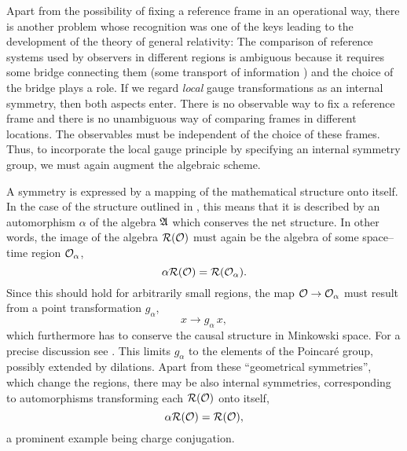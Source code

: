 Apart from the possibility of fixing a reference frame in an 
operational way, there is another problem whose recognition
was one of the 
keys leading to the development of the theory of general relativity:
The comparison of reference systems used by observers in different
regions is ambiguous because it requires some bridge connecting them 
(some transport of information \cite{Ma}) and
the choice of the bridge plays a role. If we regard {\em local}
gauge transformations as an internal symmetry, then both aspects enter. There
is no observable way to fix a reference frame and there is no
unambiguous way of comparing frames in different locations. 
The observables must be independent of the choice of these frames.
Thus, to incorporate the local gauge principle by specifying an
internal symmetry group, we must again augment the algebraic scheme.

A symmetry is expressed by a  mapping of the mathematical structure 
onto itself. In the case of the structure
outlined in \secfouandfiv, this means that it is 
described by an automorphism $\alpha$ of the algebra ${\mathfrak A}$
which conserves the net structure. In other words, the image
of the algebra ${\cal R}({\cal O})$ must again be the algebra of some 
space--time region ${\cal O}_\alpha$,
\begin{equation}
\alpha {\cal R}({\cal O}) = {\cal R} ({\cal O}_\alpha).
\end{equation}
Since this should hold for arbitrarily small
regions, the map 
${\cal O} \rightarrow {\cal O}_\alpha$ must result from a point
transformation $g_\alpha$,
\begin{equation}
x \rightarrow g_\alpha \, x,
\end{equation}
which furthermore has to conserve the causal 
structure in Minkowski space. For a precise discussion see \cite{Ar}. 
This limits  $g_\alpha$ to the elements of the Poincar\'e group, possibly
extended by dilations. Apart from these 
``geometrical symmetries'', which change the regions, there may be also
internal symmetries, corresponding to automorphisms transforming each 
${\cal R}({\cal O})$ onto itself,
\begin{equation}
\alpha {\cal R}({\cal O}) = {\cal R} ({\cal O}),
\end{equation}
a prominent example being charge conjugation.  

